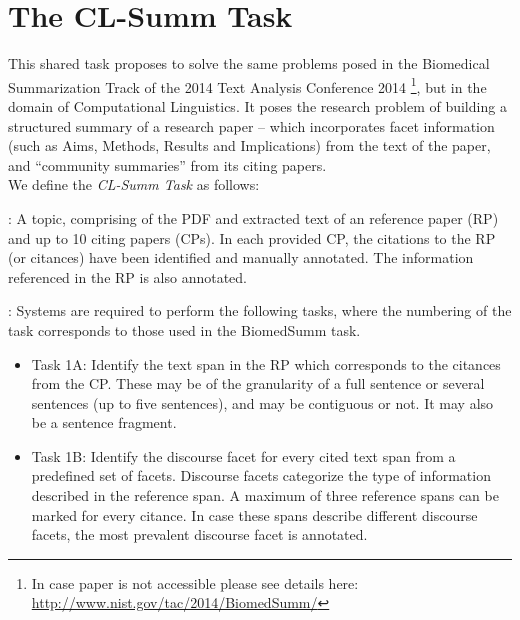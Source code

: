 \documentclass[11pt]{article}
\begin{document}

\section{The CL-Summ Task}
This shared task proposes to solve the same problems posed in the Biomedical Summarization Track of the
2014 Text Analysis Conference 2014 \cite{biomedsumm}\footnote{In case paper is not accessible 
 please see details here: \url{http://www.nist.gov/tac/2014/BiomedSumm/}}, 
but in the domain of Computational Linguistics. It poses the research problem of building a structured 
summary of a research paper -- which incorporates facet information (such as Aims, Methods, 
Results and Implications) from the text of the paper, and ``community summaries'' from its 
citing papers. \\

\noindent We define the {\it CL-Summ Task} as follows:

: A topic, comprising of the PDF and extracted
text of an reference paper (RP) and up to 10 citing papers (CPs).  In
each provided CP, the citations to the RP (or citances) have been
identified and manually annotated. The information referenced in the
RP is also annotated.

: Systems are required to perform the following
tasks, where the numbering of the task corresponds to those used in
the BiomedSumm task.

\begin{itemize}
\item Task 1A: Identify the text span in the RP which corresponds to the citances from the CP. 
  These may be of the granularity of a full   sentence or several sentences (up to five sentences), 
  and may be contiguous or not. It may also be a sentence fragment.
\vspace{-.3cm}
\item Task 1B: Identify the discourse facet for every cited text span from a predefined set of 
  facets. Discourse facets categorize the type of information described in the reference span. 
  A maximum of three reference spans can be marked for every citance. In case these spans describe 
  different discourse facets, the most prevalent discourse facet is annotated.
\end{itemize}
\end{document}
